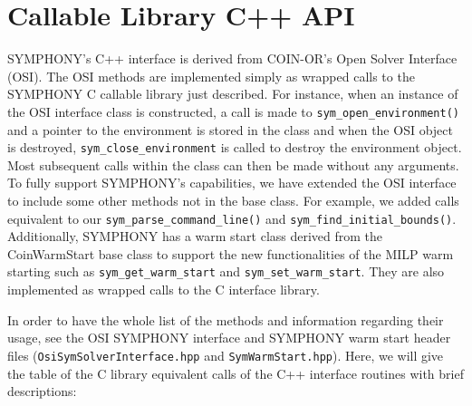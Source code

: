 \newpage

\section{Callable Library C++ API}
\label{C++_Interface}

SYMPHONY's C++ interface is derived from COIN-OR's Open Solver Interface
(OSI). The OSI methods are implemented simply as wrapped calls to the SYMPHONY
C callable library just described. For instance, when an instance of the OSI
interface class is constructed, a call is made to
\texttt{sym\_open\_environment()} and a pointer to the environment is stored
in the class and when the OSI object is destroyed,
\texttt{sym\_close\_environment} is called to destroy the environment object. 
Most subsequent calls within the class can then be made without
any arguments. To fully support SYMPHONY's capabilities, we have 
extended the OSI interface to include some other methods not in the base 
class. For example, we added calls equivalent to our 
\texttt{sym\_parse\_command\_line()} and \texttt{sym\_find\_initial\_bounds()}.
Additionally, SYMPHONY has a warm start class derived from the CoinWarmStart 
base class to support the new functionalities of the MILP warm starting such 
as \texttt{sym\_get\_warm\_start} and \texttt{sym\_set\_warm\_start}. They are 
also implemented as wrapped calls to the C interface library. 

In order to have the whole list of the methods and information 
regarding their usage, see the OSI SYMPHONY interface and SYMPHONY warm start
header files (\texttt{OsiSymSolverInterface.hpp} and 
\texttt{SymWarmStart.hpp}). Here, we will give the table of the C library 
equivalent calls of the C++ interface routines with brief descriptions:

\newpage

